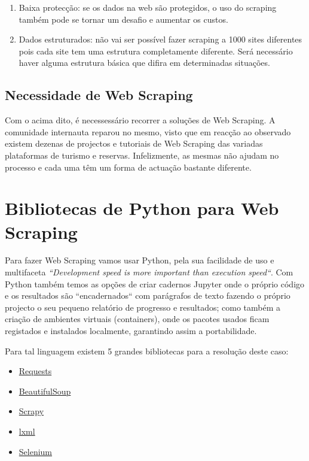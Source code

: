 \documentclass[a4paper,10pt]{article}
\begin{document}
\begin{enumerate}
    \item Baixa protecção: se os dados na web são protegidos, o uso do scraping também pode se tornar um desafio e aumentar os custos.
    \item Dados estruturados: não vai ser possível fazer scraping a 1000 sites diferentes pois cada site tem uma estrutura completamente diferente.  Será necessário haver alguma estrutura básica que difira em determinadas situações.
\end{enumerate}

\subsection{Necessidade de Web Scraping}

Com o acima dito, é necessessário recorrer a soluções de Web Scraping.
A comunidade internauta reparou no mesmo, visto que em reacção ao observado existem dezenas de projectos e tutoriais de Web Scraping das variadas plataformas de turismo e reservas.
Infelizmente, as mesmas não ajudam no processo e cada uma têm um forma de actuação bastante diferente.

\section{Bibliotecas de Python para Web Scraping}

Para fazer Web Scraping vamos usar Python, pela sua facilidade de uso e multifaceta \textit{``Development speed is more important than execution speed``}.
Com Python também temos as opções de criar cadernos Jupyter onde o próprio código e os resultados são ``encadernados`` com parágrafos de texto fazendo o próprio projecto o seu pequeno relatório de progresso e resultados; como também a criação de ambientes virtuais (containers), onde os pacotes usados ficam registados e instalados localmente, garantindo assim a portabilidade.

Para tal linguagem existem 5 grandes bibliotecas para a resolução deste caso:
\begin{itemize}
    \item \href{https://pypi.org/project/requests/}{Requests}
    \item \href{https://pypi.org/project/BeautifulSoup/}{BeautifulSoup}
    \item \href{https://pypi.org/project/Scrapy3/}{Scrapy}
    \item \href{https://pypi.org/project/lxml/}{lxml}
    \item \href{https://pypi.org/project/selenium/}{Selenium}
\end{itemize}
\end{document}
